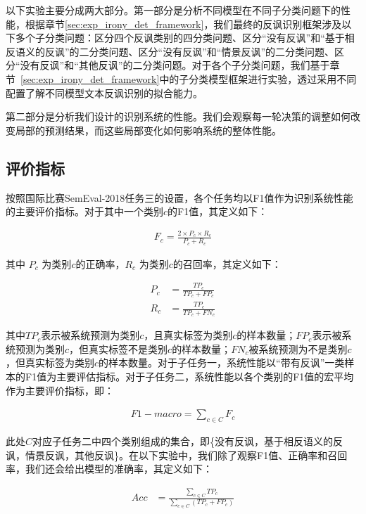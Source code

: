以下实验主要分成两大部分。第一部分是分析不同模型在不同子分类问题下的性能，根据章节\ref{sec:exp_irony_det_framework}，我们最终的反讽识别框架涉及以下多个子分类问题：区分四个反讽类别的四分类问题、区分“没有反讽”和“基于相反语义的反讽”的二分类问题、区分“没有反讽”和“情景反讽”的二分类问题、区分“没有反讽”和“其他反讽”的二分类问题。对于各个子分类问题，我们基于章节~\ref{sec:exp_irony_det_framework}中的子分类模型框架进行实验，透过采用不同配置了解不同模型文本反讽识别的拟合能力。

第二部分是分析我们设计的识别系统的性能。我们会观察每一轮决策的调整如何改变局部的预测结果，而这些局部变化如何影响系统的整体性能。


\subsection{评价指标}

按照国际比赛SemEval-2018任务三的设置，各个任务均以F1值作为识别系统性能的主要评价指标。对于其中一个类别$c$的F1值，其定义如下：

\begin{align}
  F_c = \frac{2 \times P_c \times R_c}{P_c + R_c} 
\end{align}

其中 $P_c$ 为类别$c$的正确率，$R_c$ 为类别$c$的召回率，其定义如下：

\begin{align}
  P_c &= \frac{TP_c}{TP_c + FP_c} \\
  R_c &= \frac{TP_c}{TP_c + FN_c}
\end{align} 

其中$TP_c$表示被系统预测为类别$c$，且真实标签为类别$c$的样本数量；$FP_c$表示被系统预测为类别$c$，但真实标签不是类别$c$的样本数量；$FN_c$被系统预测为不是类别$c$，但真实标签为类别$c$的样本数量。对于子任务一，系统性能以“带有反讽”一类样本的F1值为主要评估指标。对于子任务二，系统性能以各个类别的F1值的宏平均作为主要评价指标，即：

\begin{align}
  F1-macro = \sum\limits_{c \in C}F_c
\end{align}

此处$C$对应子任务二中四个类别组成的集合，即\{没有反讽，基于相反语义的反讽，情景反讽，其他反讽\}。在以下实验中，我们除了观察F1值、正确率和召回率，我们还会给出模型的准确率，其定义如下：

\begin{align}
  Acc &= \frac{\sum\limits_{c \in C} TP_c}{\sum\limits_{c \in C}(TP_c + FP_c)}
\end{align}

